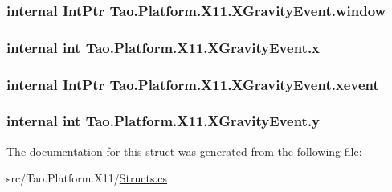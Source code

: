 \label{struct_tao_1_1_platform_1_1_x11_1_1_x_gravity_event_aaede875bd58bcf943a1383d06ad64e41}
\hypertarget{struct_tao_1_1_platform_1_1_x11_1_1_x_gravity_event_abaf631865a39cc611d5e9f28a4cade9b}{
\subsubsection[{window}]{\setlength{\rightskip}{0pt plus 5cm}internal IntPtr {\bf Tao.Platform.X11.XGravityEvent.window}}}
\label{struct_tao_1_1_platform_1_1_x11_1_1_x_gravity_event_abaf631865a39cc611d5e9f28a4cade9b}
\hypertarget{struct_tao_1_1_platform_1_1_x11_1_1_x_gravity_event_a4e8db0bfc794fdb68079df19d47542cb}{
\subsubsection[{x}]{\setlength{\rightskip}{0pt plus 5cm}internal int {\bf Tao.Platform.X11.XGravityEvent.x}}}
\label{struct_tao_1_1_platform_1_1_x11_1_1_x_gravity_event_a4e8db0bfc794fdb68079df19d47542cb}
\hypertarget{struct_tao_1_1_platform_1_1_x11_1_1_x_gravity_event_a7168a6de7a724393e045ea0adad555e5}{
\subsubsection[{xevent}]{\setlength{\rightskip}{0pt plus 5cm}internal IntPtr {\bf Tao.Platform.X11.XGravityEvent.xevent}}}
\label{struct_tao_1_1_platform_1_1_x11_1_1_x_gravity_event_a7168a6de7a724393e045ea0adad555e5}
\hypertarget{struct_tao_1_1_platform_1_1_x11_1_1_x_gravity_event_aaa3b8da7591937a8da079a89fcb56bab}{
\subsubsection[{y}]{\setlength{\rightskip}{0pt plus 5cm}internal int {\bf Tao.Platform.X11.XGravityEvent.y}}}
\label{struct_tao_1_1_platform_1_1_x11_1_1_x_gravity_event_aaa3b8da7591937a8da079a89fcb56bab}


The documentation for this struct was generated from the following file:\begin{DoxyCompactItemize}
\item 
src/Tao.Platform.X11/\hyperlink{_structs_8cs}{Structs.cs}\end{DoxyCompactItemize}
